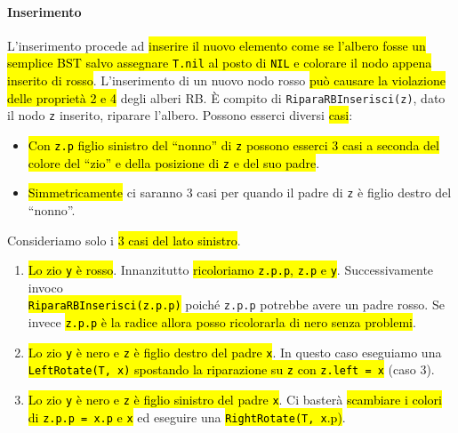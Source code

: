 \documentclass[a4paper,11pt,oneside]{article}
\theoremstyle{plain}
\theoremstyle{definition}
\theoremstyle{remark}
\begin{document}
\paragraph{Inserimento} L'inserimento procede ad \hl{inserire il nuovo elemento
come se l'albero fosse un semplice BST salvo assegnare \texttt{T.nil} al posto
di \texttt{NIL} e colorare il nodo appena inserito di rosso}. L'inserimento di
un nuovo nodo rosso \hl{può causare la violazione delle proprietà 2 e 4} degli
alberi RB. È compito di \texttt{RiparaRBInserisci(z)}, dato il nodo \texttt{z}
inserito, riparare l'albero. Possono esserci diversi \hl{casi}:

\begin{itemize}
  \item \hl{Con \texttt{z.p} figlio sinistro del ``nonno'' di \texttt{z} possono
    esserci 3 casi a seconda del colore del ``zio'' e della posizione di
    \texttt{z} e del suo padre}.
  \item \hl{Simmetricamente} ci saranno 3 casi per quando il padre di \texttt{z}
    è figlio destro del ``nonno''.
\end{itemize}

\noindent Consideriamo solo i \hl{3 casi del lato sinistro}.

\begin{enumerate}
  \item \hl{Lo zio \texttt{y} è rosso}. Innanzitutto \hl{ricoloriamo
    \texttt{z.p.p}, \texttt{z.p} e \texttt{y}}. Successivamente invoco \\
    \hl{\texttt{RiparaRBInserisci(z.p.p)}} poiché \texttt{z.p.p} potrebbe avere
    un padre rosso. Se invece \hl{\texttt{z.p.p} è la radice allora posso
    ricolorarla di nero senza problemi}.
  \item \hl{Lo zio \texttt{y} è nero e \texttt{z} è figlio destro del padre
    \texttt{x}}. In questo caso eseguiamo una \hl{\texttt{LeftRotate(T, x)}
    spostando la riparazione su \texttt{z} con \texttt{z.left = x}} (caso 3).
  \item \hl{Lo zio \texttt{y} è nero e \texttt{z} è figlio sinistro del padre
    \texttt{x}}. Ci basterà \hl{scambiare i colori di \texttt{z.p.p = x.p} e
    \texttt{x}} ed eseguire una \hl{\texttt{RightRotate(T, x}.p)}.
\end{enumerate}
\end{document}
